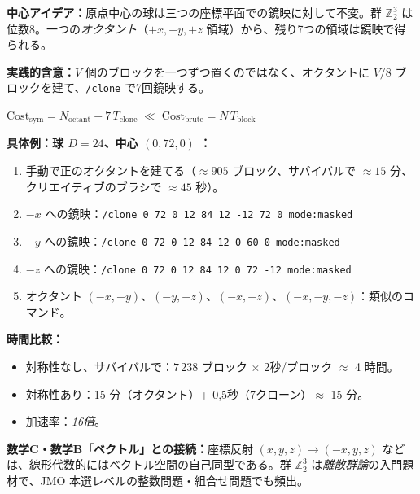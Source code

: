 \documentclass[12pt,a4paper]{scrartcl}
\newcommand{\cmd}[1]{\textcolor{earth}{\texttt{\small #1}}}
\newcommand{\tempo}[1]{\textnormal{\footnotesize\color{bg!90!white}\textsf{#1}}}
\begin{document}
\begin{katsudou}[4.3 --- 八面体対称性による最適化 \quad\tempo{15分}]\label{at:43}
\textbf{中心アイデア：}原点中心の球は三つの座標平面での鏡映に対して不変。群 $\mathbb{Z}_2^3$ は位数8。一つの\emph{オクタント}（$+x, +y, +z$ 領域）から、残り7つの領域は鏡映で得られる。

\textbf{実践的含意：}$V$ 個のブロックを一つずつ置くのではなく、オクタントに $V/8$ ブロックを建て、\cmd{/clone} で7回鏡映する。

\begin{shiki}
\centering
$\displaystyle \mathrm{Cost}_\mathrm{sym} = N_\mathrm{octant} + 7\, T_\mathrm{clone}
\;\ll\; \mathrm{Cost}_\mathrm{brute} = N\, T_\mathrm{block}$
\end{shiki}

\textbf{具体例：球 $D = 24$、中心 $(0, 72, 0)$ ：}
\begin{enumerate}[leftmargin=1.5em,itemsep=0.15em,topsep=0.3em,nosep]
  \item 手動で正のオクタントを建てる（$\approx 905$ ブロック、サバイバルで $\approx 15$ 分、クリエイティブのブラシで $\approx 45$ 秒）。
  \item $-x$ への鏡映：\cmd{/clone 0 72 0 12 84 12 -12 72 0 mode:masked}
  \item $-y$ への鏡映：\cmd{/clone 0 72 0 12 84 12 0 60 0 mode:masked}
  \item $-z$ への鏡映：\cmd{/clone 0 72 0 12 84 12 0 72 -12 mode:masked}
  \item オクタント $(-x, -y)$、$(-y, -z)$、$(-x, -z)$、$(-x, -y, -z)$：類似のコマンド。
\end{enumerate}

\textbf{時間比較：}
\begin{itemize}[leftmargin=1.3em,itemsep=0.1em,topsep=0.2em,nosep]
  \item 対称性なし、サバイバルで：$7\,238$ ブロック × 2秒/ブロック $\approx$ 4 時間。
  \item 対称性あり：15 分（オクタント）+ 0,5秒（7クローン）$\approx$ 15 分。
  \item 加速率：\emph{16倍}。
\end{itemize}

\textbf{数学C・数学B「ベクトル」との接続：}座標反射 $(x, y, z) \to (-x, y, z)$ などは、線形代数的にはベクトル空間の自己同型である。群 $\mathbb{Z}_2^3$ は\emph{離散群論}の入門題材で、JMO 本選レベルの整数問題・組合せ問題でも頻出。
\end{katsudou}
\end{document}
